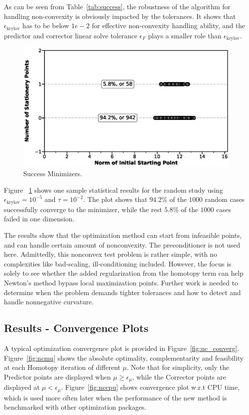 As can be seen from Table~\ref{tab:success}, the robustness of the algorithm for handling non-convexity 
is obviously impacted by the tolerances. It shows that $\epsilon_{\text{krylov}}$ has to be below $1e-2$ 
for effective non-convexity handling ability, and the predictor and corrector linear solve tolerance $\epsilon_F$ 
plays a smaller role than $\epsilon_{\text{krylov}}$.   
  
 \begin{figure}[tbp]
  \centering
  \includegraphics[clip,width=0.7\columnwidth]{./figs/chap4_test/nonconvex_1000_random.eps}%
  \caption{Success Minimizers. \label{fig:nonconvex}}
\end{figure}

Figure ~\ref{fig:nonconvex} shows one sample statistical results for the random study using 
$\epsilon_{\text{krylov}}=10^{-5}$ and $\tau = 10^{-2}$. The plot shows that $94.2\%$ of the $1000$ random cases 
successfully converge to the minimizer, while the rest $5.8\%$ of the $1000$ cases failed in one dimension.    
  
The results show that the optimization method can start from infeasible points, and can handle certain 
amount of nonconvexity. The preconditioner is not used here.  Admittedly, this nonconvex test problem is rather simple, with no complexities like bad-scaling, ill-conditioning included. However, the focus is solely to see whether the added regularization from the homotopy term can help 
Newton's method bypass local maximization points.  Further work is needed to determine when the problem demands 
tighter tolerances and how to detect and handle nonnegative curvature.  

 \subsection{Results - Convergence Plots} 
 
A typical optimization convergence plot is provided in Figure~\ref{fig:nc_converg}. Figure~\ref{fig:ncmu} 
shows the absolute optimality, complementarity and feasibility at each Homotopy iteration of different $\mu$. 
Note that for simplicity, only the Predictor points are displayed when $\mu \geq \epsilon_{\mu}$, 
while the Corrector points are displayed at $\mu < \epsilon_{\mu}$.
Figure~\ref{fig:nccpu} shows convergence plot w.r.t CPU time, 
which is used more often later when the performance of the new method is benchmarked with other 
optimization packages.

